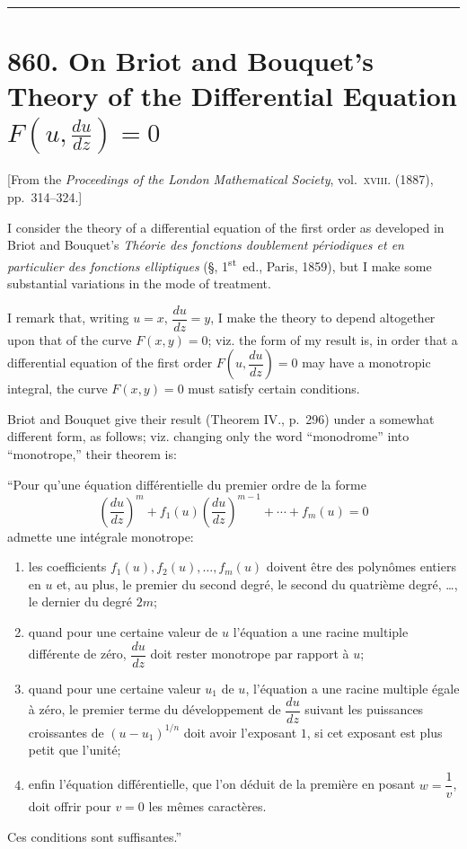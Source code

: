 \documentclass[11pt,a4paper]{book}
\begin{document}
\vspace{12pt}
\hrule
\vspace{12pt}

\section*{860. On Briot and Bouquet's Theory of the Differential Equation $F(u, \frac{du}{dz}) = 0$}

\begin{center}
[From the \textit{Proceedings of the London Mathematical Society}, vol.~\textsc{xviii}. (1887), pp.~314--324.]
\end{center}

I consider the theory of a differential equation of the first order as developed in Briot and Bouquet's \textit{Th\'eorie des fonctions doublement p\'eriodiques et en particulier des fonctions elliptiques} (\S, 1\textsuperscript{st}~ed., Paris, 1859), but I make some substantial variations in the mode of treatment.

I remark that, writing $u = x$, $\dfrac{du}{dz} = y$, I make the theory to depend altogether upon that of the curve $F(x, y) = 0$; viz. the form of my result is, in order that a differential equation of the first order $F\!\left(u, \dfrac{du}{dz}\right) = 0$ may have a monotropic integral, the curve $F(x, y) = 0$ must satisfy certain conditions.

Briot and Bouquet give their result (Theorem IV., p.~296) under a somewhat different form, as follows; viz. changing only the word ``monodrome'' into ``monotrope,'' their theorem is:

``Pour qu'une \'equation diff\'erentielle du premier ordre de la forme
\[
\left(\frac{du}{dz}\right)^m + f_1(u)\left(\frac{du}{dz}\right)^{m-1} + \cdots + f_m(u) = 0
\]
admette une int\'egrale monotrope:
\begin{enumerate}[label=\arabic*.]
\item les coefficients $f_1(u), f_2(u), \ldots, f_m(u)$ doivent \^etre des polyn\^omes entiers en $u$ et, au plus, le premier du second degr\'e, le second du quatri\`eme degr\'e, \ldots, le dernier du degr\'e $2m$;
\item quand pour une certaine valeur de $u$ l'\'equation a une racine multiple diff\'erente de z\'ero, $\dfrac{du}{dz}$ doit rester monotrope par rapport \`a $u$;
\item quand pour une certaine valeur $u_1$ de $u$, l'\'equation a une racine multiple \'egale \`a z\'ero, le premier terme du d\'eveloppement de $\dfrac{du}{dz}$ suivant les puissances croissantes de $(u - u_1)^{1/n}$ doit avoir l'exposant $1$, si cet exposant est plus petit que l'unit\'e;
\item enfin l'\'equation diff\'erentielle, que l'on d\'eduit de la premi\`ere en posant $w = \dfrac{1}{v}$, doit offrir pour $v = 0$ les m\^emes caract\`eres.
\end{enumerate}
Ces conditions sont suffisantes.''
\end{document}
